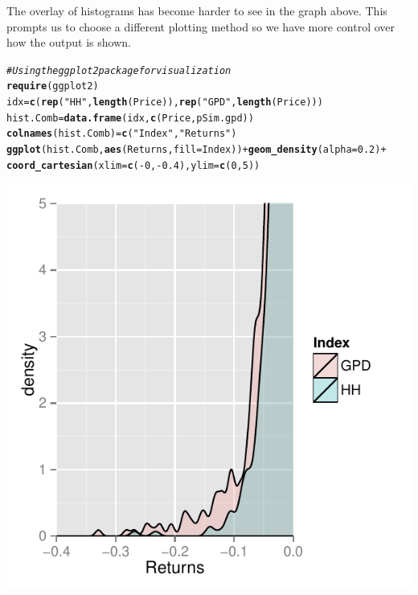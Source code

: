 \documentclass[10pt]{article}\usepackage[]{graphicx}\usepackage[]{color}
\makeatletter
\def\maxwidth{ %
  \ifdim\Gin@nat@width>\linewidth
    \linewidth
  \else
    \Gin@nat@width
  \fi
}
\newcommand{\hlnum}[1]{\textcolor[rgb]{0.686,0.059,0.569}{#1}}%
\newcommand{\hlstr}[1]{\textcolor[rgb]{0.192,0.494,0.8}{#1}}%
\newcommand{\hlcom}[1]{\textcolor[rgb]{0.678,0.584,0.686}{\textit{#1}}}%
\newcommand{\hlopt}[1]{\textcolor[rgb]{0,0,0}{#1}}%
\newcommand{\hlstd}[1]{\textcolor[rgb]{0.345,0.345,0.345}{#1}}%
\newcommand{\hlkwb}[1]{\textcolor[rgb]{0.69,0.353,0.396}{#1}}%
\newcommand{\hlkwc}[1]{\textcolor[rgb]{0.333,0.667,0.333}{#1}}%
\newcommand{\hlkwd}[1]{\textcolor[rgb]{0.737,0.353,0.396}{\textbf{#1}}}%
\newenvironment{kframe}{%
 \def\at@end@of@kframe{}%
 \ifinner\ifhmode%
  \def\at@end@of@kframe{\end{minipage}}%
  \begin{minipage}{\columnwidth}%
 \fi\fi%
 \def\FrameCommand##1{\hskip\@totalleftmargin \hskip-\fboxsep
 \colorbox{shadecolor}{##1}\hskip-\fboxsep
     \hskip-\linewidth \hskip-\@totalleftmargin \hskip\columnwidth}%
 \MakeFramed {\advance\hsize-\width
   \@totalleftmargin\z@ \linewidth\hsize
   \@setminipage}}%
 {\par\unskip\endMakeFramed%
 \at@end@of@kframe}
\newenvironment{knitrout}{}{} %
\makeatother
\begin{document}
The overlay of histograms has become harder to see in the graph above. This prompts us to choose a different plotting method so we have more control over how the output is shown.
\begin{knitrout}
\color{fgcolor}\begin{kframe}
\begin{alltt}
\hlcom{# Using the ggplot2 package for visualization}
\hlkwd{require}\hlstd{(ggplot2)}
\hlstd{idx} \hlkwb{=} \hlkwd{c}\hlstd{(}\hlkwd{rep}\hlstd{(}\hlstr{"HH"}\hlstd{,} \hlkwd{length}\hlstd{(Price)),} \hlkwd{rep}\hlstd{(}\hlstr{"GPD"}\hlstd{,} \hlkwd{length}\hlstd{(Price)))}
\hlstd{hist.Comb} \hlkwb{=} \hlkwd{data.frame}\hlstd{(idx,} \hlkwd{c}\hlstd{(Price, pSim.gpd))}
\hlkwd{colnames}\hlstd{(hist.Comb)} \hlkwb{=} \hlkwd{c}\hlstd{(}\hlstr{"Index"}\hlstd{,} \hlstr{"Returns"}\hlstd{)}
\hlkwd{ggplot}\hlstd{(hist.Comb,} \hlkwd{aes}\hlstd{(Returns,} \hlkwc{fill} \hlstd{= Index))} \hlopt{+} \hlkwd{geom_density}\hlstd{(}\hlkwc{alpha} \hlstd{=} \hlnum{0.2}\hlstd{)} \hlopt{+}
    \hlkwd{coord_cartesian}\hlstd{(}\hlkwc{xlim} \hlstd{=} \hlkwd{c}\hlstd{(}\hlopt{-}\hlnum{0}\hlstd{,} \hlopt{-}\hlnum{0.4}\hlstd{),} \hlkwc{ylim} \hlstd{=} \hlkwd{c}\hlstd{(}\hlnum{0}\hlstd{,} \hlnum{5}\hlstd{))}
\end{alltt}
\end{kframe}

{\centering \includegraphics[width=\maxwidth]{figure/unnamed-chunk-7} 

}



\end{knitrout}
\end{document}
